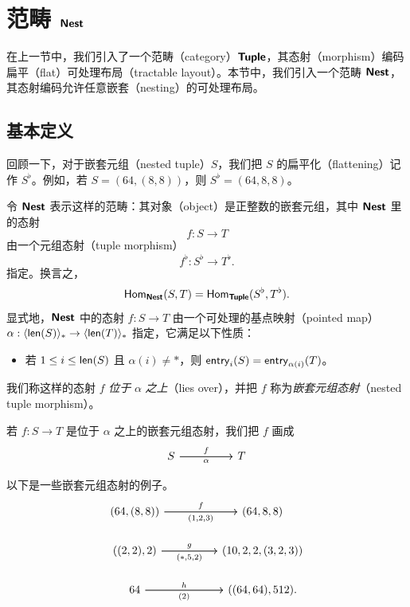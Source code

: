 \section{范畴 ${\boldsymbol{\mathsf{Nest}}}$}\label{thecategoryNestTuplesection}

在上一节中，我们引入了一个范畴（category）${\boldsymbol{\mathsf{Tuple}}}$，其态射（morphism）编码扁平（flat）可处理布局（tractable layout）。本节中，我们引入一个范畴 ${\boldsymbol{\mathsf{Nest}}}$，其态射编码允许任意嵌套（nesting）的可处理布局。

\subsection{基本定义}

回顾一下，对于嵌套元组（nested tuple）$S$，我们把 $S$ 的扁平化（flattening）记作 $S^\flat$。例如，若 $S = (64,(8,8))$，则 $S^\flat = (64,8,8)$。

\begin{definition}\label{definitionofNest}
    令 ${\boldsymbol{\mathsf{Nest}}}$ 表示这样的范畴：其对象（object）是正整数的嵌套元组，其中 ${\boldsymbol{\mathsf{Nest}}}$ 里的态射
    \[f:S \to T\]
    由一个元组态射（tuple morphism）
    \[
    f^\flat:S^\flat \to T^\flat.
    \]
指定。换言之，
\[
\mathsf{Hom}_{{\boldsymbol{\mathsf{Nest}}}}(S,T) = \mathsf{Hom}_{{\boldsymbol{\mathsf{Tuple}}}}(S^\flat,T^\flat).
\]
显式地，${\boldsymbol{\mathsf{Nest}}}$ 中的态射 $f:S \to T$ 由一个可处理的基点映射（pointed map）$\alpha:\langle \mathsf{len}(S) \rangle_* \to \langle \mathsf{len}(T) \rangle_*$ 指定，它满足以下性质：
\begin{itemize}
    \item 若 $1 \leq i \leq \mathsf{len}(S)$ 且 $\alpha(i) \neq *$，则 $\mathsf{entry}_i(S) = \mathsf{entry}_{\alpha(i)}(T)$。
\end{itemize}
    我们称这样的态射 $f$ {\it 位于} $\alpha$ {\it 之上}（lies over），并把 $f$ 称为{\it 嵌套元组态射}（nested tuple morphism）。
\end{definition}

\begin{notation}
    若 $f:S \to T$ 是位于 $\alpha$ 之上的嵌套元组态射，我们把 $f$ 画成
    \[ \begin{tikzcd}
    S \ar[rr,"f"] \ar[rr,swap,"\alpha"] & & T
    \end{tikzcd} \]
\end{notation}

\begin{example}
    以下是一些嵌套元组态射的例子。
    \[ \begin{tikzcd}
    (64, (8,8)) \ar[rr,"f"] \ar[rr,swap,"(1{,}2{,}3)"] & &  (64, 8,8) \\
    ((2,2),2) \ar[rr,"g"] \ar[rr,swap,"(*{,}5{,}2)"] & &  (10,2,2,(3,2,3)) \\
    64 \ar[rr,"h"] \ar[rr,swap,"(2)"] & &  ((64,64),512).
    \end{tikzcd} \]
\end{example}

